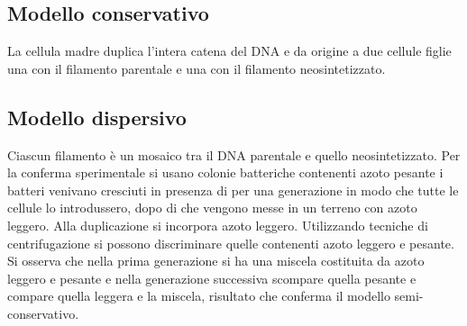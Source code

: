 \subsection{Modello conservativo}
La cellula madre duplica l'intera catena del DNA e da origine a due cellule figlie una con il filamento parentale e una con il filamento neosintetizzato. 
\subsection{Modello dispersivo}
Ciascun filamento \`e un mosaico tra il DNA parentale e quello neosintetizzato. 
Per la conferma sperimentale si usano colonie batteriche contenenti azoto pesante  i batteri venivano cresciuti in presenza di  per una generazione in modo che tutte le
cellule lo introdussero, dopo di che vengono messe in un terreno con azoto leggero. Alla  duplicazione si incorpora azoto leggero. Utilizzando tecniche di centrifugazione si possono 
discriminare quelle contenenti azoto leggero e pesante. Si osserva che nella prima generazione si ha una miscela costituita da azoto leggero e pesante e nella generazione successiva 
scompare quella pesante e compare quella leggera e la miscela, risultato che conferma il modello semi-conservativo. 

